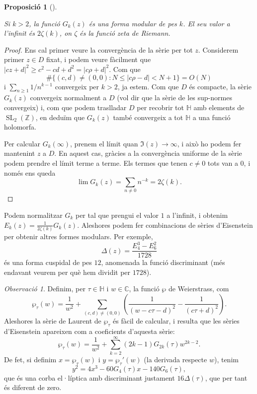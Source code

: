 \documentclass[
  letterpaper,
  DIV=11,
  numbers=noendperiod]{scrreprt}
\theoremstyle{plain}
\theoremstyle{plain}
\theoremstyle{definition}
\theoremstyle{plain}
\newtheorem{proposition}{Proposició}[chapter]
\theoremstyle{plain}
\theoremstyle{definition}
\theoremstyle{remark}
\newtheorem{refremark}{Observació}[chapter]
\begin{document}
\begin{proposition}[]\protect\hypertarget{prp-}{}\label{prp-}

Si \(k>2\), la funció \(G_k(z)\) és una forma modular de pes \(k\). El
seu valor a l'infinit és \(2\zeta(k)\), on \(\zeta\) és la funció zeta
de Riemann.

\end{proposition}

\begin{proof}
Ens cal primer veure la convergència de la sèrie per tot \(z\).
Considerem primer \(z\in D\) fixat, i podem veure fàcilment que
\(|c z + d|^2 \geq c^2-cd+d^2= |c\rho + d|^2\). Com que \[
\#\{ (c,d)\neq (0,0) : N \leq |c\rho - d|< N+1\} = O(N)
\] i \(\sum_{n\geq 1} 1/n^{k-1}\) convergeix per \(k>2\), ja estem. Com
que \(D\) és compacte, la sèrie \(G_k(z)\) convergeix normalment a \(D\)
(vol dir que la sèrie de les sup-normes convergeix) i, com que podem
traslladar \(D\) per recobrir tot \(\mathbb{H}\) amb elements de
\(\operatorname{SL}_2(\mathbb{Z})\), en deduïm que \(G_k(z)\) també
convergeix a tot \(\mathbb{H}\) a una funció holomorfa.

Per calcular \(G_k(\infty)\), prenem el límit quan
\(\Im(z)\longrightarrow\infty\), i això ho podem fer mantenint \(z\) a
\(D\). En aquest cas, gràcies a la convergència uniforme de la sèrie
podem prendre el límit terme a terme. Els termes que tenen \(c\neq 0\)
tots van a \(0\), i només ens queda \[
\lim G_k(z) = \sum_{n\neq 0} n^{-k} = 2 \zeta(k).
\]
\end{proof}

Podem normalitzar \(G_k\) per tal que prengui el valor \(1\) a
l'infinit, i obtenim \(E_k(z)=\frac{1}{2\zeta(k)} G_k(z)\). Aleshores
podem fer combinacions de sèries d'Eisenstein per obtenir altres formes
modulars. Per exemple, \[
\Delta(z) = \frac{E_4^3 - E_6^2}{1728}
\] és una forma cuspidal de pes \(12\), anomenada la funció discriminant
(més endavant veurem per què hem dividit per \(1728\)).

\begin{refremark}
Definim, per \(\tau\in\mathbb{H}\) i \(w\in\mathbb{C}\), la funció
\(\wp\) de Weierstrass, com \[
\wp_\tau(w)=\frac{1}{w^2}+\sum_{(c,d)\neq (0,0)} \left(\frac{1}{(w-c\tau-d)^2}-\frac{1}{(c\tau+d)^2}\right).
\] Aleshores la sèrie de Laurent de \(\wp_\tau\) és fàcil de calcular, i
resulta que les sèries d'Eisenstein apareixen com a coeficients
d'aquesta sèrie: \[
\wp_\tau(w) = \frac{1}{w^2} + \sum_{k=2}^\infty (2k-1)G_{2k}(\tau)w^{2k-2}.
\] De fet, si definim \(x=\wp_\tau(w)\) i \(y=\wp_\tau'(w)\) (la
derivada respecte \(w\)), tenim \[
y^2=4x^3-60G_4(\tau)x-140G_6(\tau),
\] que és una corba el·líptica amb discriminant justament
\(16\Delta(\tau)\), que per tant és diferent de zero.

\label{rem-}

\end{refremark}
\end{document}
